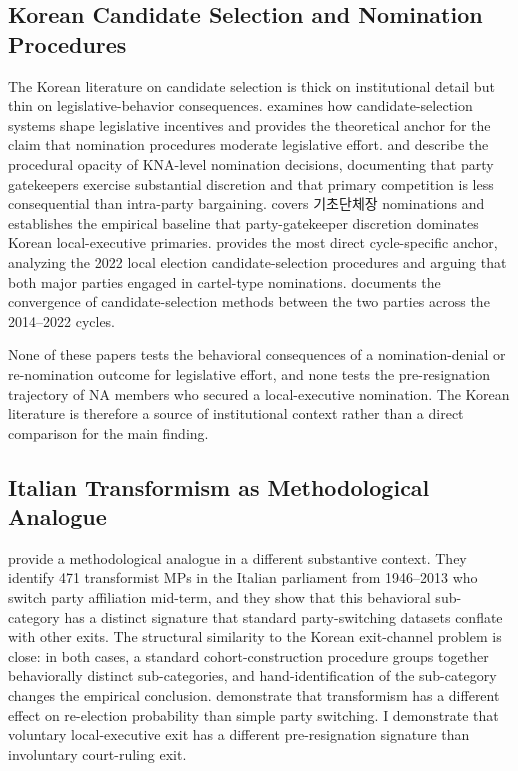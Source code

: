 \documentclass[11pt]{article}
\begin{document}
\subsection{Korean Candidate Selection and Nomination Procedures}

The Korean literature on candidate selection is thick on institutional detail but thin on legislative-behavior consequences. \citet{kim2020} examines how candidate-selection systems shape legislative incentives and provides the theoretical anchor for the claim that nomination procedures moderate legislative effort. \citet{lee2020} and \citet{jung2021} describe the procedural opacity of KNA-level nomination decisions, documenting that party gatekeepers exercise substantial discretion and that primary competition is less consequential than intra-party bargaining. \citet{eom2014} covers 기초단체장 nominations and establishes the empirical baseline that party-gatekeeper discretion dominates Korean local-executive primaries. \citet{yoon2022} provides the most direct cycle-specific anchor, analyzing the 2022 local election candidate-selection procedures and arguing that both major parties engaged in cartel-type nominations. \citet{kim2025} documents the convergence of candidate-selection methods between the two parties across the 2014--2022 cycles.

None of these papers tests the behavioral consequences of a nomination-denial or re-nomination outcome for legislative effort, and none tests the pre-resignation trajectory of NA members who secured a local-executive nomination. The Korean literature is therefore a source of institutional context rather than a direct comparison for the main finding.

\subsection{Italian Transformism as Methodological Analogue}

\citet{giommoni2022} provide a methodological analogue in a different substantive context. They identify 471 transformist MPs in the Italian parliament from 1946--2013 who switch party affiliation mid-term, and they show that this behavioral sub-category has a distinct signature that standard party-switching datasets conflate with other exits. The structural similarity to the Korean exit-channel problem is close: in both cases, a standard cohort-construction procedure groups together behaviorally distinct sub-categories, and hand-identification of the sub-category changes the empirical conclusion. \citet{giommoni2022} demonstrate that transformism has a different effect on re-election probability than simple party switching. I demonstrate that voluntary local-executive exit has a different pre-resignation signature than involuntary court-ruling exit.
\end{document}
